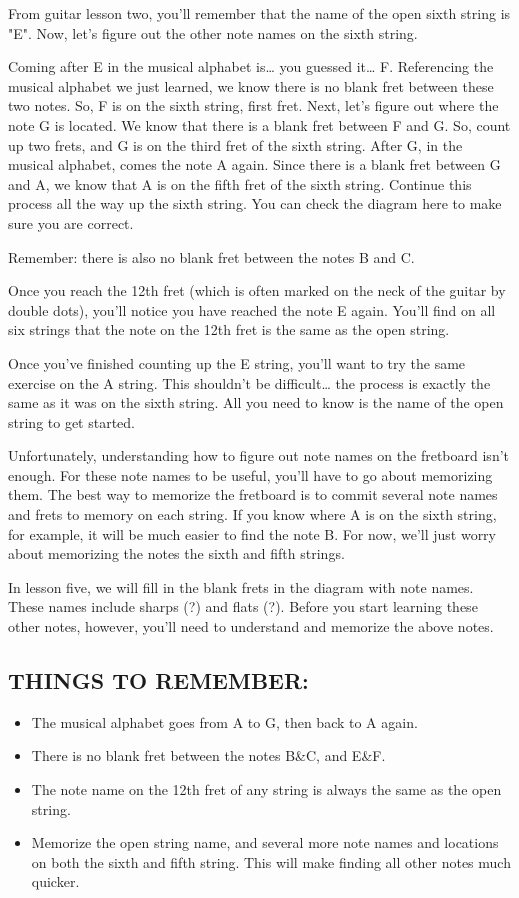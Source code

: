 From guitar lesson two, you'll remember that the name of the open sixth string
is "E". Now, let's figure out the other note names on the sixth string.

Coming after E in the musical alphabet is\ldots{} you guessed it\ldots{} F. Referencing
the musical alphabet we just learned, we know there is no blank fret between
these two notes. So, F is on the sixth string, first fret. Next, let's figure
out where the note G is located. We know that there is a blank fret between F
and G. So, count up two frets, and G is on the third fret of the sixth string.
After G, in the musical alphabet, comes the note A again. Since there is a
blank fret between G and A, we know that A is on the fifth fret of the sixth
string. Continue this process all the way up the sixth string. You can check
the diagram here to make sure you are correct.

Remember: there is also no blank fret between the notes B and C.

Once you reach the 12th fret (which is often marked on the neck of the guitar
by double dots), you'll notice you have reached the note E again. You'll find
on all six strings that the note on the 12th fret is the same as the open
string.

Once you've finished counting up the E string, you'll want to try the same
exercise on the A string. This shouldn't be difficult\ldots{} the process is exactly
the same as it was on the sixth string. All you need to know is the name of the
open string to get started.

Unfortunately, understanding how to figure out note names on the fretboard
isn't enough. For these note names to be useful, you'll have to go about
memorizing them. The best way to memorize the fretboard is to commit several
note names and frets to memory on each string. If you know where A is on the
sixth string, for example, it will be much easier to find the note B. For now,
we'll just worry about memorizing the notes the sixth and fifth strings.

In lesson five, we will fill in the blank frets in the diagram with note names.
These names include sharps (?) and flats (?). Before you start learning these
other notes, however, you'll need to understand and memorize the above notes.

\subsection{THINGS TO REMEMBER:}
\begin{itemize}
\item The musical alphabet goes from A to G, then back to A again.
\item There is no blank fret between the notes B\&C, and E\&F.
\item The note name on the 12th fret of any string is always the same as the
      open string.
\item Memorize the open string name, and several more note names and locations
      on both the sixth and fifth string. This will make finding all other notes much
      quicker.
\end{itemize}


